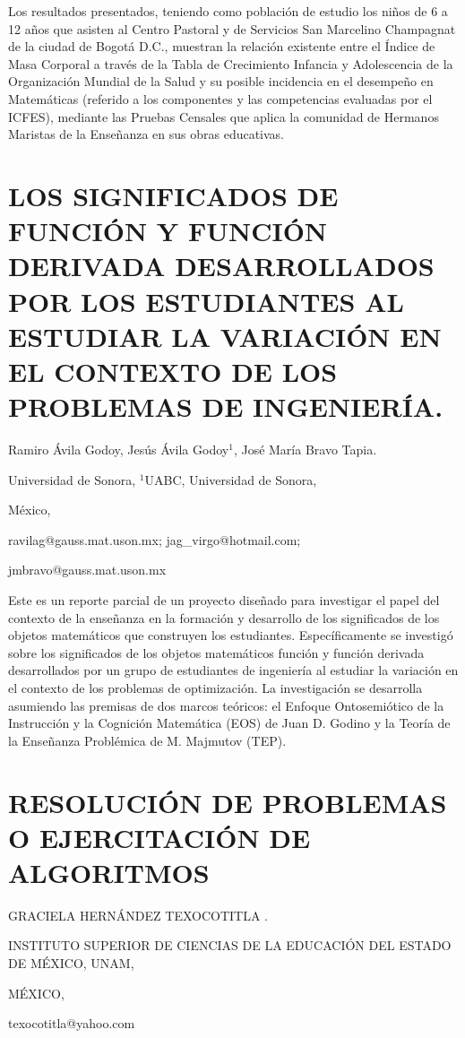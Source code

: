 Los resultados presentados, teniendo como población de estudio los
niños de 6 a 12 años que asisten al Centro Pastoral y de Servicios
San Marcelino Champagnat de la ciudad de Bogotá D.C., muestran la
relación existente entre el Índice de Masa Corporal a través de la
Tabla de Crecimiento Infancia y Adolescencia de la Organización Mundial
de la Salud y su posible incidencia en el desempeño en Matemáticas
(referido a los componentes y las competencias evaluadas por el ICFES),
mediante las Pruebas Censales que aplica la comunidad de Hermanos
Maristas de la Enseñanza en sus obras educativas. 


\section{LOS SIGNIFICADOS DE FUNCIÓN Y FUNCIÓN DERIVADA DESARROLLADOS POR
LOS ESTUDIANTES AL ESTUDIAR LA VARIACIÓN EN EL CONTEXTO DE LOS PROBLEMAS
DE INGENIERÍA.}

\begin{datos}

Ramiro Ávila Godoy, Jesús Ávila Godoy$^{1}$, José María Bravo Tapia.

Universidad de Sonora, $^{1}$UABC, Universidad de Sonora,

México,

ravilag@gauss.mat.uson.mx; jag\_virgo@hotmail.com;

jmbravo@gauss.mat.uson.mx

\end{datos}

Este es un reporte parcial de un proyecto diseñado para investigar
el papel del contexto de la enseñanza en la formación y desarrollo
de los significados de los objetos matemáticos que construyen los
estudiantes. Específicamente se investigó sobre los significados de
los objetos matemáticos función y función derivada desarrollados por
un grupo de estudiantes de ingeniería al estudiar la variación en
el contexto de los problemas de optimización. La investigación se
desarrolla asumiendo las premisas de dos marcos teóricos: el Enfoque
Ontosemiótico de la Instrucción y la Cognición Matemática (EOS) de
Juan D. Godino y la Teoría de la Enseñanza Problémica de M. Majmutov
(TEP). 


\section{RESOLUCIÓN DE PROBLEMAS O EJERCITACIÓN DE ALGORITMOS}

\begin{datos}

GRACIELA HERNÁNDEZ TEXOCOTITLA .

INSTITUTO SUPERIOR DE CIENCIAS DE LA EDUCACIÓN DEL ESTADO DE MÉXICO,
UNAM,

MÉXICO,

texocotitla@yahoo.com

\end{datos}

